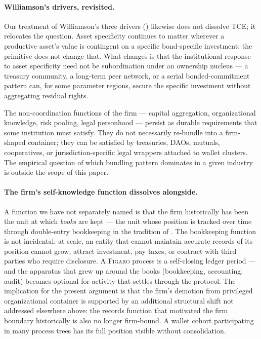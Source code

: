 \documentclass[11pt,a4paper]{article}
\theoremstyle{definition}
\theoremstyle{remark}
\newcommand{\figaro}{\textsc{Figaro}}
\begin{document}
\paragraph{Williamson's drivers, revisited.}
Our treatment of Williamson's three drivers
() likewise does not dissolve TCE; it relocates
the question. Asset specificity continues to matter wherever a
productive asset's value is contingent on a specific bond-specific
investment; the primitive does not change that. What changes is
that the institutional response to asset specificity need not be
subordination under an ownership nucleus --- a treasury community,
a long-term peer network, or a serial bonded-commitment pattern
can, for some parameter regions, secure the specific investment
without aggregating residual rights.

The non-coordination functions of the firm --- capital aggregation,
organizational knowledge, risk pooling, legal personhood --- persist
as durable requirements that some institution must satisfy. They do
not necessarily re-bundle into a firm-shaped container; they can be
satisfied by treasuries, DAOs, mutuals, cooperatives, or
jurisdiction-specific legal wrappers attached to wallet clusters.
The empirical question of which bundling pattern dominates in a
given industry is outside the scope of this paper.

\paragraph{The firm's self-knowledge function dissolves alongside.}
A function we have not separately named is that the firm
historically has been the unit at which \emph{books} are kept ---
the unit whose position is tracked over time through
double-entry bookkeeping in the tradition of
\citet{pacioli1494summa}. The bookkeeping function is not
incidental: at scale, an entity that cannot maintain accurate
records of its position cannot grow, attract investment, pay
taxes, or contract with third parties who require disclosure.
A \figaro{} process is a self-closing ledger period --- and the
apparatus that grew up
around the books (bookkeeping, accounting, audit) becomes
optional for activity that settles through the protocol. The
implication for the present argument is that the firm's
demotion from privileged organizational container is supported
by an additional structural shift not addressed elsewhere
above: the records function that motivated the firm boundary
historically is also no longer firm-bound. A wallet cohort
participating in many process trees has its full position
visible without consolidation.
\end{document}

